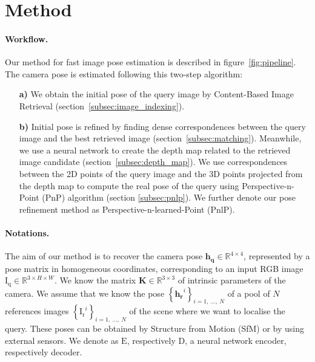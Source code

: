 \section{Method}
\label{sec:method}



\paragraph{Workflow.}
Our method for fast image pose estimation is described in figure~\ref{fig:pipeline}. The camera pose is estimated following this two-step algorithm:
\begin{itemize}
	\item[\textbf{a)}] We obtain the initial pose of the query image by Content-Based Image Retrieval (section~\ref{subsec:image_indexing}).
	\item[\textbf{b)}] Initial pose is refined by finding dense correspondences between the query image and the best retrieved image (section~\ref{subsec:matching}). Meanwhile, we use a neural network to create the depth map related to the retrieved image candidate (section~\ref{subsec:depth_map}). We use correspondences between the 2D points of the query image and the 3D points projected from the depth map to compute the real pose of the query using Perspective-n-Point (PnP) algorithm (section \ref{subsec:pnlp}). We further denote our pose refinement method as Perspective-n-learned-Point (PnlP).
\end{itemize}

\paragraph{Notations.}
The aim of our method is to recover the camera pose $\mathbf{h_q}\in\mathbb{R}^{4\times 4}$, represented by a pose matrix in homogeneous coordinates, corresponding to an input RGB image $\mathrm{I_q}\in\mathbb{R}^{3\times H\times W}$. We know the matrix $\mathbf{K}\in\mathbb{R}^{3\times 3}$ of intrinsic parameters of the camera. We assume that we know the pose $\left\{ \mathbf{h_r}^{i} \right\}_{i=1,\ \ldots ,\ N}$ of a pool of $N$ references images $\left\{ \mathrm{I_{r}}^{i} \right\}_{i=1,\ \ldots ,\ N}$ of the scene where we want to localise the query. These poses can be obtained by Structure from Motion (SfM) or by using external sensors. We denote as $\mathrm{E}$, respectively $\mathrm{D}$, a neural network encoder, respectively decoder.

